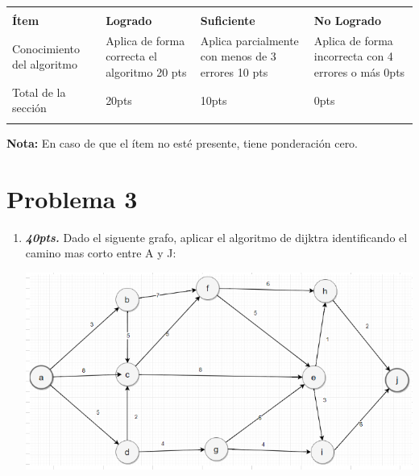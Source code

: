 \documentclass{exam}
\begin{document}
\begin{enumerate}
\begin{questions}
\begin{enumerate}
    \end{enumerate}
  \end{questions}

  \begin{table}[H]
    \centering
    \begin{tabular}{
      !{\color{gray!50}\vrule}p{3.9cm}
      !{\color{gray!50}\vrule}p{3.6cm}
      !{\color{gray!50}\vrule}p{3.6cm}
      !{\color{gray!50}\vrule}p{3.6cm}
      !{\color{gray!50}\vrule}}  \hline
       \\  \hline
      \textbf{Ítem} & \textbf{Logrado} & \textbf{Suficiente} & \textbf{No Logrado}\\  \hline
      Conocimiento del algoritmo &
      Aplica de forma correcta el algoritmo 20 pts   &
      Aplica parcialmente con menos de 3 errores 10 pts  &
      Aplica de forma incorrecta con 4 errores o más 0pts\\  \hline
      Total de la sección &  20pts & 10pts & 0pts\\  \hline
    \end{tabular}
    \label{tbl:1}
  \end{table}
  \vspace{-5mm}
  \textbf{Nota:} En caso de que el {í}tem no est{é} presente, tiene ponderaci{ó}n cero.
  \newpage

  \newpage
  \vspace{-7mm}
  \section{\textbf{Problema 3}}
  \noindent
  \begin{questions}

    \begin{enumerate}

      \item \textbf{\emph{40pts.}} Dado el siguente grafo, aplicar el algoritmo de dijktra identificando el camino mas corto entre A y J:

      \begin{center}
          \includegraphics[width=.9\textwidth]{./img/grafo}
      \end{center}


\end{enumerate}
\end{questions}
\end{enumerate}
\end{document}
